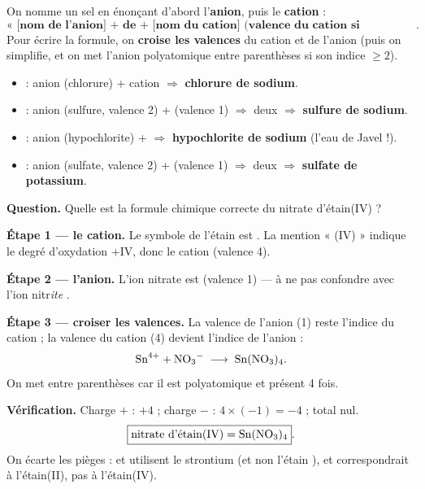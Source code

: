 \documentclass[11pt,a4paper]{article}
\begin{document}
\begin{regle}
On nomme un sel en énonçant d'abord l'\textbf{anion}, puis le \textbf{cation} :
\[ \textbf{« [nom de l'anion] + de + [nom du cation] (valence du cation si nécessaire) »}. \]
Pour écrire la formule, on \textbf{croise les valences} du cation et de l'anion (puis on simplifie, et on
met l'anion polyatomique entre parenthèses si son indice $\geq 2$).
\end{regle}

\begin{exemple}
\begin{itemize}[leftmargin=1.6em,topsep=2pt,itemsep=2pt]
  \item {} : anion  (chlorure) + cation  $\Rightarrow$ \textbf{chlorure de sodium}.
  \item {} : anion  (sulfure, valence 2) +  (valence 1) $\Rightarrow$ deux 
        $\Rightarrow$ \textbf{sulfure de sodium}.
  \item {} : anion  (hypochlorite) +  $\Rightarrow$ \textbf{hypochlorite de sodium}
        (l'eau de Javel !).
  \item {} : anion  (sulfate, valence 2) +  (valence 1) $\Rightarrow$ deux 
        $\Rightarrow$ \textbf{sulfate de potassium}.
\end{itemize}
\end{exemple}

\begin{exemple}
\textbf{Question.} Quelle est la formule chimique correcte du nitrate d'étain(IV) ?

\smallskip
\textbf{Étape 1 — le cation.} Le symbole de l'étain est . La mention « (IV) » indique le degré
d'oxydation $+\mathrm{IV}$, donc le cation  (valence 4).

\textbf{Étape 2 — l'anion.} L'ion nitrate est  (valence 1) — à ne pas confondre avec l'ion
nitr\emph{ite} .

\textbf{Étape 3 — croiser les valences.} La valence de l'anion (1) reste l'indice du cation ; la valence
du cation (4) devient l'indice de l'anion :
\[ \ce{Sn^4+} + \ce{NO3-} \;\longrightarrow\; \ce{Sn(NO3)4}. \]
On met  entre parenthèses car il est polyatomique et présent 4 fois.

\textbf{Vérification.} Charge $+$ : $+4$ ; charge $-$ : $4 \times (-1) = -4$ ; total nul.
\[ \boxed{\text{nitrate d'étain(IV)} = \ce{Sn(NO3)4}}. \]
On écarte les pièges :  et  utilisent le strontium  (et non l'étain ),
et  correspondrait à l'étain(II), pas à l'étain(IV).
\end{exemple}
\end{document}
